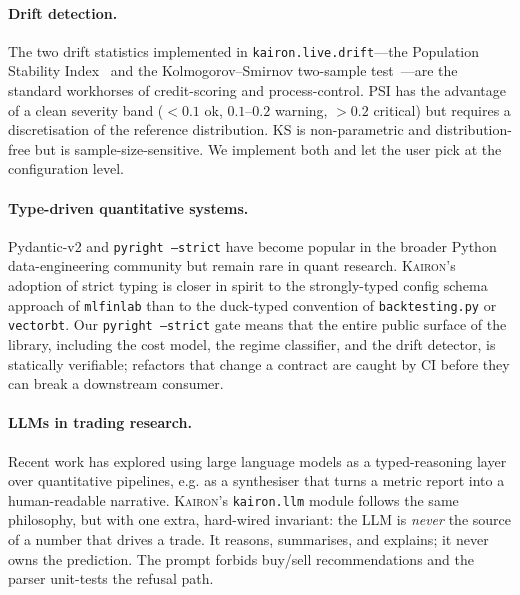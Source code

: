 \documentclass[11pt,a4paper]{article}
\providecommand{\kairon}{\textsc{Kairon}}
\providecommand{\PSIsym}{\textsc{PSI}}
\providecommand{\KSsym}{\textsc{KS}}
\begin{document}
\paragraph{Drift detection.}
The two drift statistics implemented in
\texttt{kairon.live.drift}---the Population Stability
Index~\cite{yurdakul2018} and the Kolmogorov--Smirnov
two-sample test~\cite{hodges1958}---are the standard workhorses
of credit-scoring and process-control. \PSIsym{} has the advantage
of a clean severity band ($\!<\!0.1$ ok, $0.1$--$0.2$ warning,
$\!>\!0.2$ critical) but requires a discretisation of the
reference distribution. \KSsym{} is non-parametric and
distribution-free but is sample-size-sensitive. We implement
both and let the user pick at the configuration level.

\paragraph{Type-driven quantitative systems.}
Pydantic-v2 and \texttt{pyright --strict} have become popular in
the broader Python data-engineering community but remain rare in
quant research. \kairon{}'s adoption of strict typing is closer
in spirit to the strongly-typed config schema approach of
\texttt{mlfinlab} than to the duck-typed convention of
\texttt{backtesting.py} or \texttt{vectorbt}. Our
\texttt{pyright --strict} gate means that the entire public
surface of the library, including the cost model, the regime
classifier, and the drift detector, is statically verifiable;
refactors that change a contract are caught by CI before they
can break a downstream consumer.

\paragraph{LLMs in trading research.}
Recent work has explored using large language models as a
typed-reasoning layer over quantitative pipelines, e.g. as a
synthesiser that turns a metric report into a human-readable
narrative. \kairon{}'s \texttt{kairon.llm} module follows the
same philosophy, but with one extra, hard-wired invariant: the
LLM is \emph{never} the source of a number that drives a trade.
It reasons, summarises, and explains; it never owns the
prediction. The prompt forbids buy/sell recommendations and the
parser unit-tests the refusal path.

\end{document}
